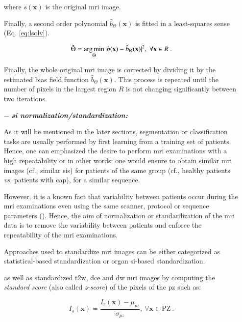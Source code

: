 \begin{enumerate}[leftmargin=*]
\noindent where $s(\mathbf{x})$ is the original \ac{mri} image.

Finally, a second order polynomial $\hat{b}_{\Theta}(\mathbf{x})$ is fitted in a least-squares sense (Eq. \ref{eq:lsolv}).

\begin{equation}
	\hat{\Theta} = \operatorname*{arg\,min}_{\Theta} | b(\mathbf{x}) - \hat{b}_{\Theta}(\mathbf{x}) |^{2}, \ \forall \mathbf{x} \in R \ .
	\label{eq:lsolv}
\end{equation}

Finally, the whole original \ac{mri} image is corrected by dividing it by the estimated bias field function $\hat{b}_{\Theta}(\mathbf{x})$. This process is repeated until the number of pixels in the largest region $R$ is not changing significantly between two iterations.

\item[$-$] \textbf{\textit{\Ac{si} normalization/standardization:}}

As it will be mentioned in the later sections, segmentation or classification tasks are usually performed by first learning from a training set of patients. Hence, one can emphasized the desire to perform \ac{mri} examinations with a high repeatability or in other words; one would ensure to obtain similar \ac{mri} images (cf., similar \acp{si}) for patients of the same group (cf., healthy patients \textit{vs.} patients with \ac{cap}), for a similar sequence.

However, it is a known fact that variability between patients occur during the \ac{mri} examinations even using the same scanner, protocol or sequence parameters (\cite{Nyul1999}). Hence, the aim of normalization or standardization of the \ac{mri} data is to remove the variability between patients and enforce the repeatability of the \ac{mri} examinations.

Approaches used to standardize \ac{mri} images can be either categorized as statistical-based standardization or organ \ac{si}-based standardization. 

\cite{Artan2009,Artan2010} as well as \cite{Ozer2009,Ozer2010} standardized \ac{t2w}, \ac{dce} and \ac{dw} \ac{mri} images by computing the \textit{standard score} (also called \textit{z-score}) of the pixels of the \ac{pz} such as:

\begin{equation}
	I_s(\mathbf{x}) = \frac{ I_r(\mathbf{x}) - \mu_{pz}}{\sigma_{pz}}, \ \forall \mathbf{x} \in \text{PZ} \ .
	\label{eq:meansta}
\end{equation}


\end{enumerate}
